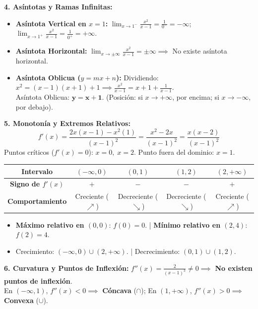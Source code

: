 \documentclass[10pt,a4paper]{article}
\begin{document}
\textbf{4. Asíntotas y Ramas Infinitas:}
\begin{itemize}\itemsep 0.5pt
    \item \textbf{Asíntota Vertical en $x = 1$:} $\lim_{x \to 1^-} \frac{x^2}{x - 1} = \frac{1}{0^-} = -\infty$; \quad $\lim_{x \to 1^+} \frac{x^2}{x - 1} = \frac{1}{0^+} = +\infty$.
    \item \textbf{Asíntota Horizontal:} $\lim_{x \to \pm\infty} \frac{x^2}{x - 1} = \pm\infty \implies$ No existe asíntota horizontal.
    \item \textbf{Asíntota Oblicua ($y = mx + n$):} Dividiendo: $x^2 = (x - 1)(x + 1) + 1 \implies \frac{x^2}{x - 1} = x + 1 + \frac{1}{x - 1}$.\\
    Asíntota Oblicua: $\mathbf{y = x + 1}$. (Posición: si $x \to +\infty$, por encima; si $x \to -\infty$, por debajo).
\end{itemize}

\textbf{5. Monotonía y Extremos Relativos:}
$$f'(x) = \frac{2x(x - 1) - x^2(1)}{(x - 1)^2} = \frac{x^2 - 2x}{(x - 1)^2} = \frac{x(x - 2)}{(x - 1)^2}$$
Puntos críticos ($f'(x) = 0$): $x = 0, \; x = 2$. Punto fuera del dominio: $x = 1$.

\begin{center}
\footnotesize
\renewcommand{\arraystretch}{1.1}
\begin{tabular}{|c|c|c|c|c|}
\hline
\textbf{Intervalo} & $(-\infty, 0)$ & $(0, 1)$ & $(1, 2)$ & $(2, +\infty)$ \\ \hline
\textbf{Signo de $f'(x)$} & $+$ & $-$ & $-$ & $+$ \\ \hline
\textbf{Comportamiento} & Creciente ($\nearrow$) & Decreciente ($\searrow$) & Decreciente ($\searrow$) & Creciente ($\nearrow$) \\ \hline
\end{tabular}
\end{center}
\vspace{-2pt}
\begin{itemize}\itemsep 0pt
    \item \textbf{Máximo relativo en $(0, 0)$}: $f(0) = 0$. \quad | \quad \textbf{Mínimo relativo en $(2, 4)$}: $f(2) = 4$.
    \item Crecimiento: $(-\infty, 0) \cup (2, +\infty)$. \quad | \quad Decrecimiento: $(0, 1) \cup (1, 2)$.
\end{itemize}

\textbf{6. Curvatura y Puntos de Inflexión:}
$f''(x) = \frac{2}{(x - 1)^3} \neq 0 \implies$ \textbf{No existen puntos de inflexión}.\\
En $(-\infty, 1)$, $f''(x) < 0 \implies$ \textbf{Cóncava} ($\cap$); \quad En $(1, +\infty)$, $f''(x) > 0 \implies$ \textbf{Convexa} ($\cup$).
\end{document}
